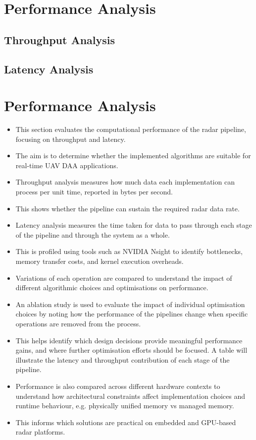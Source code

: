 \section{Performance Analysis}
\subsection{Throughput Analysis}
\subsection{Latency Analysis}


\section{Performance Analysis}

\begin{itemize}
    \item This section evaluates the computational performance of the radar pipeline, focusing on throughput and latency.
    \item The aim is to determine whether the implemented algorithms are suitable for real-time UAV DAA applications.

    \item Throughput analysis measures how much data each implementation can process per unit time, reported in bytes per second.
    \item This shows whether the pipeline can sustain the required radar data rate.

    \item Latency analysis measures the time taken for data to pass through each stage of the pipeline and through the system as a whole.
    \item This is profiled using tools such as NVIDIA Nsight to identify bottlenecks, memory transfer costs, and kernel execution overheads.

    \item Variations of each operation are compared to understand the impact of different algorithmic choices and optimisations on performance. 
    \item An ablation study is used to evaluate the impact of individual optimisation choices by noting how the performance of the pipelines change when specific operations are removed from the process.
    \item This helps identify which design decisions provide meaningful performance gains, and where further optimisation efforts should be focused. A table will illustrate the latency and throughput contribution of each stage of the pipeline.  
    \item Performance is also compared across different hardware contexts to understand how architectural constraints affect implementation choices and runtime behaviour, e.g. physically unified memory vs managed memory.
    \item This informs which solutions are practical on embedded and GPU-based radar platforms.
\end{itemize}